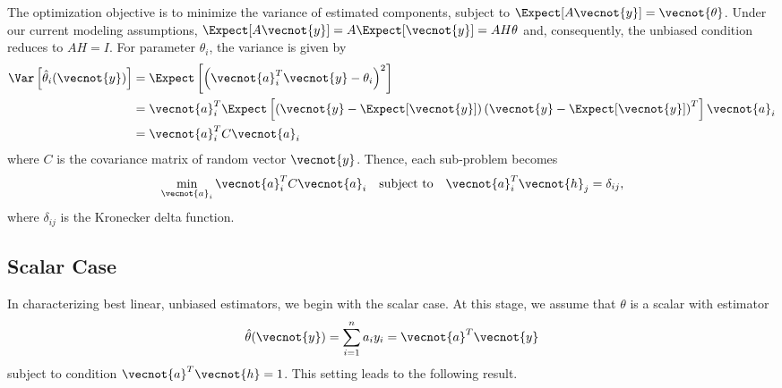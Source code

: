 The optimization objective is to minimize the variance of estimated components, subject to $\Expect [ A \vecnot{y} ] = \vecnot{\theta}$.
Under our current modeling assumptions, $\Expect [ A \vecnot{y} ] = A \Expect [ \vecnot{y} ] = A H \theta$ and, consequently, the unbiased condition reduces to $AH = I$.
For parameter $\theta_i$, the variance is given by
\begin{equation*}
\begin{split}
\Var \left[ \hat{\theta}_i (\vecnot{y}) \right]
&= \Expect \left[ \left( \vecnot{a}_i^T \vecnot{y} - \theta_i \right)^2 \right] \\
&= \vecnot{a}_i^T \Expect \left[ \left( \vecnot{y}
- \Expect [\vecnot{y}] \right)
\left( \vecnot{y} - \Expect [\vecnot{y}] \right)^T \right] \vecnot{a}_i \\
&= \vecnot{a}_i^T C \vecnot{a}_i
\end{split}
\end{equation*}
where $C$ is the covariance matrix of random vector $\vecnot{y}$.
Thence, each sub-problem becomes
\begin{equation*}
\min_{\vecnot{a}_i} \vecnot{a}_i^T C \vecnot{a}_i \quad \text{subject to} \quad \vecnot{a}_i^T \vecnot{h}_j = \delta_{ij} ,
\end{equation*}
where $\delta_{ij}$ is the Kronecker delta function.


\subsection{Scalar Case}
\label{section:ScalarBLUE}

In characterizing best linear, unbiased estimators, we begin with the scalar case.
At this stage, we assume that $\theta$ is a scalar with estimator
\begin{equation*}
\hat{\theta} (\vecnot{y}) = \sum_{i=1}^n a_i y_i = \vecnot{a}^T \vecnot{y}
\end{equation*}
subject to condition $\vecnot{a}^T \vecnot{h} = 1$.
This setting leads to the following result.

